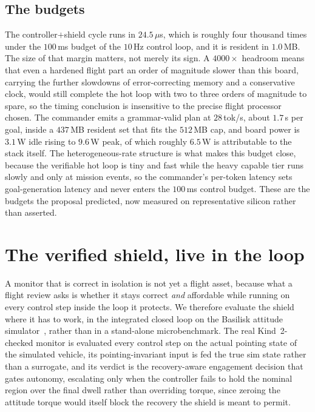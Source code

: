 \documentclass[journal]{IEEEtran}
\begin{document}
\subsection{The budgets} The controller$+$shield cycle runs in $24.5\,\mu$s, which is
roughly four thousand times under the $100$\,ms budget of the $10$\,Hz control loop, and it is
resident in $1.0$\,MB. The size of that margin matters, not merely its sign. A
$4000\times$ headroom means that even a hardened flight part an order of magnitude slower than this
board, carrying the further slowdowns of error-correcting memory and a conservative clock, would
still complete the hot loop with two to three orders of magnitude to spare, so the timing
conclusion is insensitive to the precise flight processor chosen. The commander emits a
grammar-valid plan at $28$\,tok/s, about $1.7$\,s per goal, inside a $437$\,MB resident set that
fits the $512$\,MB cap, and board power is $3.1$\,W idle rising to $9.6$\,W peak, of which roughly
$6.5$\,W is attributable to the stack itself. The heterogeneous-rate structure is what makes this
budget close, because the verifiable hot loop is tiny and fast while the heavy capable tier runs
slowly and only at mission events, so the commander's per-token latency sets goal-generation
latency and never enters the $100$\,ms control budget. These are the budgets the proposal
predicted, now measured on representative silicon rather than asserted.

\section{The verified shield, live in the loop}
\label{sec:shield}
A monitor that is correct in isolation is not yet a flight asset, because what a flight review
asks is whether it stays correct \emph{and} affordable while running on every control step inside
the loop it protects. We therefore evaluate the shield where it has to work, in the integrated
closed loop on the Basilisk attitude simulator~\cite{Basilisk}, rather than in a stand-alone
microbenchmark. The real Kind~2-checked monitor is evaluated every control step on the actual
pointing state of the simulated vehicle, its pointing-invariant input is fed the true sim state
rather than a surrogate, and its verdict is the recovery-aware engagement decision that gates
autonomy, escalating only when the controller fails to hold the nominal region over the final
dwell rather than overriding torque, since zeroing the attitude torque would itself block the
recovery the shield is meant to permit.
\end{document}
